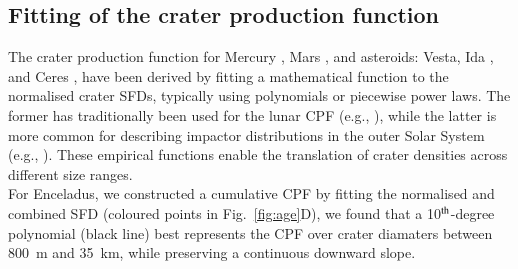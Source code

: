 \documentclass[preprint,11pt,3p,times,authoryear]{elsarticle}
\begin{document}
{\subsection{Fitting of the crater production function}
\label{subsec:fitting}
The crater production function for Mercury \citep{Neukum2001}, Mars \citep{Ivanov2001, Hartmann2005}, and asteroids: Vesta, Ida \citep{Schmedemann2014}, and Ceres \citep{Hiesinger2016}, have been derived by fitting a mathematical function to the normalised crater SFDs, typically using polynomials or piecewise power laws. The former has traditionally been used for the lunar CPF (e.g., \citealt{Neukum2001}), while the latter is more common for describing impactor distributions in the outer Solar System (e.g., \citealt{Zahnle2003}). These empirical functions enable the translation of crater densities across different size ranges. \\

For Enceladus, we constructed a cumulative CPF by fitting the normalised and combined SFD (coloured points in Fig.~\ref{fig:age}D), we found that a 10$^{\rm th}$-degree polynomial (black line) best represents the CPF over crater diamaters between 800~m and 35~km, while preserving a continuous downward slope. \\

}
\end{document}
